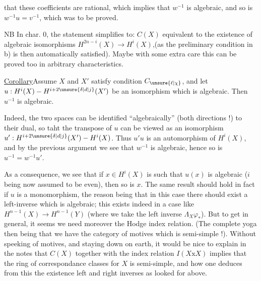 
that these coefficients are rational, which implies that $w^{-1}$ is algebraic, and so is $w^{-1}u=v^{-1}$, which was to be proved.

NB In char. 0,  the statement simplifies to: $C(X)$ equivalent to the existence of algebraic isomorphisms $H^{2n-i}(X)\to H^i(X)$,(as the preliminary condition in b) is then automatically satisfied). Maybe with some extra care this can be proved too in arbitrary characteristics.

\uline{Corollary}\quad Assume $X$ and $X'$ satisfy condition $C_{\unsure{\ell|\chi}}$, and let $u:H^i(X)\mathbin{-}H^{i+2\unsure{\delta|d|j}}(X')$  be an isomorphism which is algebraic. Then $u^{-1}$ is algebraic.

Indeed, the two spaces can be identified ``algebraically'' (both directions !) to their dual, so taht the transpose of $u$ can be viewed as an isomorphism $u':H^{i+2\unsure{\delta|d|j}}(X')\mathbin{-}H^i(X)$. Thus $u'u$ is an  automorphism  of $H^i(X)$, and by the previous argument we see that $w^{-1}$ is algebraic, hence so is $u^{-1}=w^{-1}u'$.

As a consequence, we see that if $x\in H^i(X)$ is such that $u(x)$ is algebraic ($i$ being now assumed to be even), then so is $x$. The same result should hold in fact if $u$ is a monomorphism, the reason being that in this case there should exist a left-inverse which is algebraic; this exists indeed in a case like $H^{n-1}(X)\to H^{n-1}(Y)$ (where we take the left inverse $\Lambda_X\varphi_*$). But to get  in general, it seems we need moreover the Hodge index relation. (The complete yoga then being that we have the category of motives which is semi-simple !). Without speeking of motives, and staying down on earth, it would be nice to explain in the notes that $C(X)$ together with the index relation $I(X\mathrm{x}X)$ implies that the ring of correspondance classes for $X$ is semi-simple, and how one deduces from this the existence  left and right inverses as looked for above.

